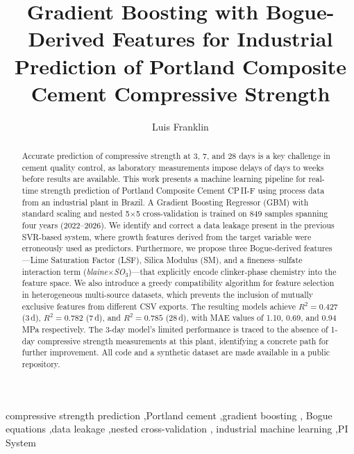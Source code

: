 \documentclass[preprint,12pt]{elsarticle}
\begin{document}
\begin{frontmatter}

\title{Gradient Boosting with Bogue-Derived Features for Industrial Prediction
       of Portland Composite Cement Compressive Strength}

\author[inst1]{Luis Franklin}


\begin{abstract}
Accurate prediction of compressive strength at 3, 7, and 28 days is a key
challenge in cement quality control, as laboratory measurements impose delays
of days to weeks before results are available.
This work presents a machine learning pipeline for real-time strength prediction
of Portland Composite Cement CP\,II-F using process data from an industrial
plant in Brazil.
A Gradient Boosting Regressor (GBM) with standard scaling and nested 5$\times$5
cross-validation is trained on 849 samples spanning four years (2022--2026).
We identify and correct a data leakage present in the previous SVR-based system,
where growth features derived from the target variable were erroneously used as
predictors.
Furthermore, we propose three Bogue-derived features---Lime Saturation Factor
(LSF), Silica Modulus (SM), and a fineness--sulfate interaction term
(\textit{blaine}$\times$\textit{SO}$_3$)---that explicitly encode
clinker-phase chemistry into the feature space.
We also introduce a greedy compatibility algorithm for feature selection in
heterogeneous multi-source datasets, which prevents the inclusion of mutually
exclusive features from different CSV exports.
The resulting models achieve $R^2 = 0.427$ (3\,d), $R^2 = 0.782$ (7\,d),
and $R^2 = 0.785$ (28\,d), with MAE values of 1.10, 0.69, and 0.94\,MPa
respectively.
The 3-day model's limited performance is traced to the absence of 1-day
compressive strength measurements at this plant, identifying a concrete path
for further improvement.
All code and a synthetic dataset are made available in a public repository.
\end{abstract}

\begin{keyword}
compressive strength prediction \sep Portland cement \sep gradient boosting \sep
Bogue equations \sep data leakage \sep nested cross-validation \sep
industrial machine learning \sep PI System
\end{keyword}

\end{frontmatter}
\end{document}
